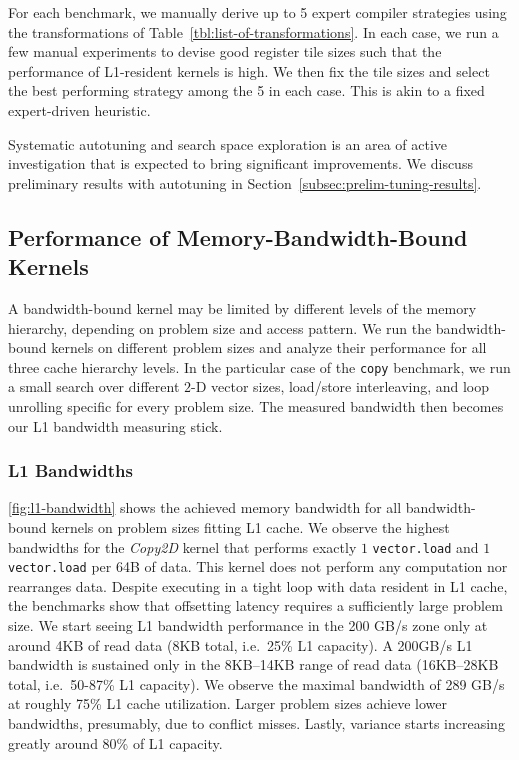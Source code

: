 For each benchmark, we manually derive up to 5 expert compiler strategies using the transformations of Table~\ref{tbl:list-of-transformations}. 
In each case, we run a few manual experiments to devise good register tile sizes such that the performance of L1-resident kernels is high.
We then fix the tile sizes and select the best performing strategy among the 5 in each case.
This is akin to a fixed expert-driven heuristic.

Systematic autotuning and search space exploration is an area of active investigation that is expected to bring significant improvements.
We discuss preliminary results with autotuning in Section~\ref{subsec:prelim-tuning-results}.

\subsection{Performance of Memory-Bandwidth-Bound Kernels}

A bandwidth-bound kernel may be limited by different levels of the memory hierarchy, depending on problem size and access pattern. 
We run the bandwidth-bound kernels on different problem sizes and analyze their performance for all three cache hierarchy levels. 
In the particular case of the \lstinline|copy| benchmark, we run a small search over different $2$-D vector sizes, load/store interleaving, and loop unrolling specific for every problem size.
The measured bandwidth then becomes our L1 bandwidth measuring stick.

\subsubsection{L1 Bandwidths}
\autoref{fig:l1-bandwidth} shows the achieved memory bandwidth for all bandwidth-bound kernels on problem sizes fitting L1 cache. 
We observe the highest bandwidths for the \emph{Copy2D} kernel that performs exactly $1$ \lstinline|vector.load| and $1$ \lstinline|vector.load| per 64B of data. 
This kernel does not perform any computation nor rearranges data. 
Despite executing in a tight loop with data resident in L1 cache, the benchmarks show that offsetting latency requires a sufficiently large problem size. 
We start seeing L1 bandwidth performance in the 200 GB/s zone only at around 4KB of read data (8KB total, i.e.\ 25\% L1 capacity).
A 200GB/s L1 bandwidth is sustained only in the 8KB--14KB range of read data (16KB--28KB total, i.e.\ 50-87\% L1 capacity).
We observe the maximal bandwidth of 289 GB/s at roughly 75\% L1 cache utilization. 
Larger problem sizes achieve lower bandwidths, presumably, due to conflict misses.
Lastly, variance starts increasing greatly around 80\% of L1 capacity.

